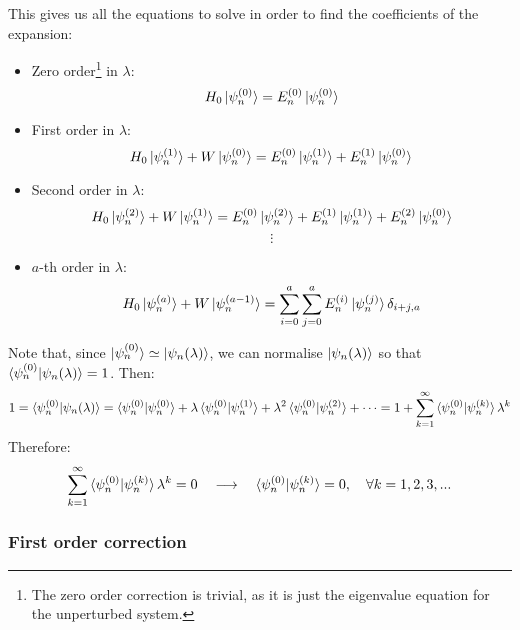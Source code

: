This gives us all the equations to solve in order to find the coefficients of the expansion:
\begin{itemize}
    \item Zero order\footnote{The zero order correction is trivial, as it is just the eigenvalue equation for the unperturbed system.} in $\lambda$:
    \begin{equation}
        H_0\ket{\psi_n^{(0)}} = E_n^{(0)}\ket{\psi_n^{(0)}}
    \end{equation}
    \item First order in $\lambda$:
    \begin{equation} \label{first_order_correction_eig_eqn}
        H_0\ket{\psi_n^{(1)}} + W\ket{\psi_n^{(0)}} = E_n^{(0)}\ket{\psi_n^{(1)}} + E_n^{(1)}\ket{\psi_n^{(0)}}
    \end{equation}
    \item Second order in $\lambda$:
    \begin{equation}
        H_0\ket{\psi_n^{(2)}} + W\ket{\psi_n^{(1)}} = E_n^{(0)}\ket{\psi_n^{(2)}} + E_n^{(1)}\ket{\psi_n^{(1)}} + E_n^{(2)}\ket{\psi_n^{(0)}}
    \end{equation}
    $$
    \vdots
    $$
    \item $a$-th order in $\lambda$:
    \begin{equation}
        H_0\ket{\psi_n^{(a)}} + W \ket{\psi_n^{(a-1)}} = \sum_{i=0}^{a}\sum_{j=0}^{a}E_n^{(i)}\ket{\psi_n^{(j)}}\delta_{i+j,a}
    \end{equation}
\end{itemize} 

Note that, since $\ket{\psi_n^{(0)}}\simeq \ket{\psi_n(\lambda)}$, we can normalise $\ket{\psi_n(\lambda)}$ so that $\braket{\psi_n^{(0)}|\psi_n(\lambda)} = 1$. Then:
\begin{equation}
    1 = \braket{\psi_n^{(0)}|\psi_n(\lambda)} = \braket{\psi_n^{(0)}|\psi_n^{(0)}} + \lambda \braket{\psi_n^{(0)}|\psi_n^{(1)}} + \lambda^2\braket{\psi_n^{(0)}|\psi_n^{(2)}} + \cdots = 1 + \sum_{k=1}^\infty \braket{\psi_n^{(0)}|\psi_n^{(k)}}\lambda^k
\end{equation}
Therefore:
\begin{equation} \label{orthonormal_perturbation_terms}
    \sum_{k=1}^\infty \braket{\psi_n^{(0)}|\psi_n^{(k)}}\lambda^k = 0 \quad\longrightarrow\quad \braket{\psi_n^{(0)}|\psi_n^{(k)}} = 0,\quad \forall k = 1, 2, 3, ...
\end{equation}


\subsubsection{First order correction}

